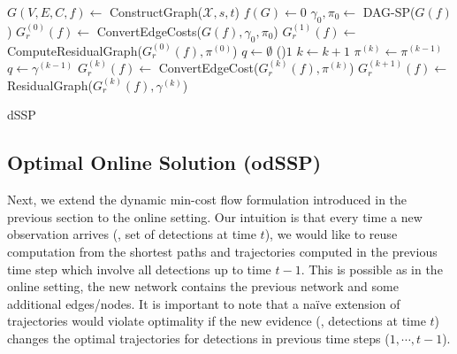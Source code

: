 \documentclass[10pt,twocolumn,letterpaper]{article}
\DeclareMathOperator*{\cost}{cost}
\begin{document}
\begin{algorithm}[t]
  \DontPrintSemicolon
  $G(V,E,C,f) \gets$ ConstructGraph($\mathcal{X},s,t$)\;
  $f(G) \gets 0$ 
  $\gamma_0, \pi_0 \gets$ DAG-SP($G(f)$) 
  $G_r^{(0)}(f) \gets$ ConvertEdgeCosts($G(f), \gamma_0, \pi_0$) 
  $G^{(1)}_r(f) \gets$ ComputeResidualGraph($G^{(0)}_r(f),\pi^{(0)}$)\;
  $q \gets \emptyset$ 
  \While(){$1$} {
    $k \gets k+1$\;
$\pi^{(k)} \gets \pi^{(k-1)}$\;
$q \gets \gamma^{(k-1)}$\;
    $G^{(k)}_r(f) \gets$ ConvertEdgeCost($G^{(k)}_r(f), \pi^{(k)}$)\;
    $G^{(k+1)}_r(f) \gets$ ResidualGraph($G^{(k)}_r(f), \gamma^{(k)}$)\;
    \If{$\sum_{i=1}^k \cost(\gamma^{(i)}) > |\cost(\gamma^{(0)})|$}{
      break\;
    }
  }
  \;
  \caption{dSSP}
  \label{algo:ssp_offline_dDijkstra}
\end{algorithm} \subsection{Optimal Online Solution (odSSP)}\label{sec:online_optimal}

Next, we extend the dynamic min-cost flow formulation introduced in the previous section to the online setting.
Our intuition is that every time a new observation arrives (\ie, set of detections at time $t$), we would like to reuse computation from the shortest paths and trajectories computed in the previous time step which involve all detections up to time $t-1$. This is possible as in the online setting, the new network contains the previous network and some additional edges/nodes. It is important to note that a na\"ive extension of trajectories would violate optimality if the new evidence (\ie, detections at time $t$) changes the optimal trajectories for detections in previous time steps ($1, \cdots, t-1$). 
\end{document}
